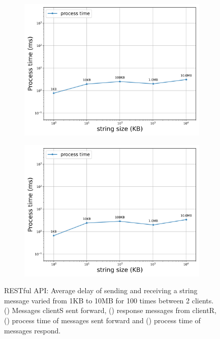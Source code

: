\begin{figure}[htb]
    \begin{subfigure}[b]{0.49\textwidth}
        \centering
        \includegraphics[width=\textwidth]{figures/tests/proportional_tests/Rest_Average_string_messages_sending_time_of_100_tests.png}\hfill 
        \caption{} \label{fig: proportional-rest-stringsize-a}
    \end{subfigure}
    \begin{subfigure}[b]{0.49\textwidth}
        \centering
        \includegraphics[width=\textwidth]{figures/tests/proportional_tests/Rest_Average_string_messages_receiving_time_of_100_tests.png}\hfill 
        \caption{} \label{fig: proportional-rest-stringsize-b}
    \end{subfigure}
    
    \caption{RESTful API: Average delay of sending and receiving a string message varied from 1KB 
    to 10MB for 100 times between 2 clients. () 
    Messages clientS sent forward, 
    () response messages from clientR, 
    () process time of messages sent forward 
    and () process time of messages respond. 
    \label{fig: proportional-rest-stringsize}}
\end{figure}





